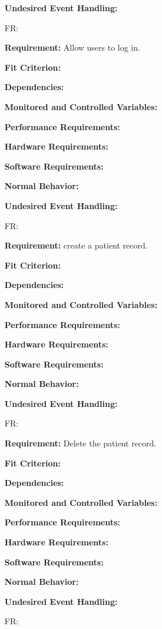 \documentclass[12pt]{article}
\newcounter{reqnum} %
\begin{document}
\begin{itemize}
\textbf{Undesired Event Handling:} 


\item[FR\refstepcounter{reqnum}\thereqnum \label{FR_meaningfulLabel}:] 

\textbf{Requirement:} Allow users to log in.

\textbf{Fit Criterion:}  

\textbf{Dependencies:}  

\textbf{Monitored and Controlled Variables:} 

\textbf{Performance Requirements:} 

\textbf{Hardware Requirements:} 

\textbf{Software Requirements:} 

\textbf{Normal Behavior:} 

\textbf{Undesired Event Handling:} 


\item[FR\refstepcounter{reqnum}\thereqnum \label{FR_meaningfulLabel}:] 

\textbf{Requirement:} create a patient record.

\textbf{Fit Criterion:}  

\textbf{Dependencies:}  

\textbf{Monitored and Controlled Variables:} 

\textbf{Performance Requirements:} 

\textbf{Hardware Requirements:} 

\textbf{Software Requirements:} 

\textbf{Normal Behavior:} 

\textbf{Undesired Event Handling:} 

\item[FR\refstepcounter{reqnum}\thereqnum \label{FR_meaningfulLabel}:] 

\textbf{Requirement:} Delete the patient record.

\textbf{Fit Criterion:}  

\textbf{Dependencies:}  

\textbf{Monitored and Controlled Variables:} 

\textbf{Performance Requirements:} 

\textbf{Hardware Requirements:} 

\textbf{Software Requirements:} 

\textbf{Normal Behavior:} 

\textbf{Undesired Event Handling:} 

\item[FR\refstepcounter{reqnum}\thereqnum \label{FR_meaningfulLabel}:] 


\end{itemize}
\end{document}
